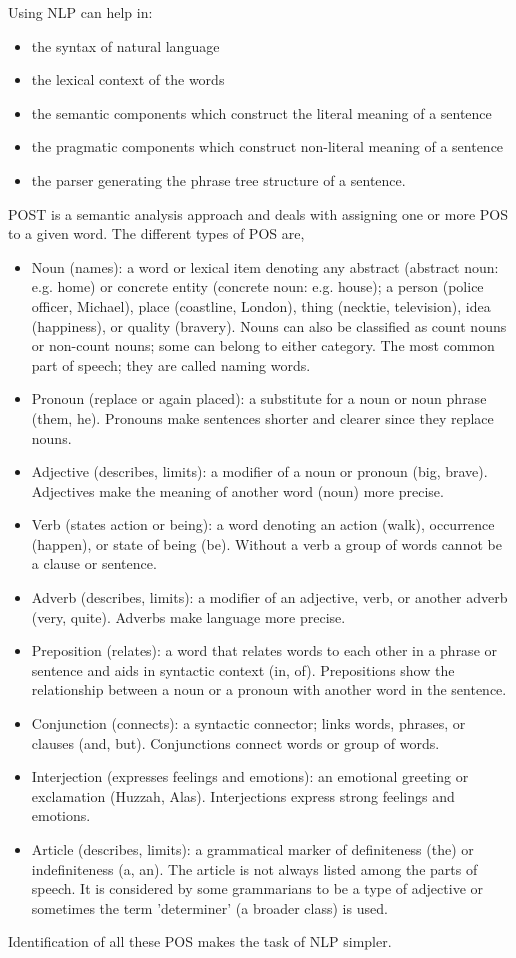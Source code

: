 \begin{multicols*}{2}
	Using \gls{NLP} can help in:
	\begin{itemize}
		\item the syntax of natural language
		\item the lexical context of the words
		\item the semantic components which construct the literal meaning of a sentence
		\item the pragmatic components which construct non-literal meaning of a sentence
		\item the parser generating the phrase tree structure of a sentence.
	\end{itemize}
	\gls{POST} is a semantic analysis approach and deals with assigning one or more \gls{POS} to a given word. The different types of \gls{POS} are,
	\begin{itemize}
		\item Noun (names): a word or lexical item denoting any abstract (abstract noun: e.g. home) or concrete entity (concrete noun: e.g. house); a person (police officer, Michael), place (coastline, London), thing (necktie, television), idea (happiness), or quality (bravery). Nouns can also be classified as count nouns or non-count nouns; some can belong to either category. The most common part of speech; they are called naming words.
		\item Pronoun (replace or again placed): a substitute for a noun or noun phrase (them, he). Pronouns make sentences shorter and clearer since they replace nouns.
		\item Adjective (describes, limits): a modifier of a noun or pronoun (big, brave). Adjectives make the meaning of another word (noun) more precise.
		\item Verb (states action or being): a word denoting an action (walk), occurrence (happen), or state of being (be). Without a verb a group of words cannot be a clause or sentence.
		\item Adverb (describes, limits): a modifier of an adjective, verb, or another adverb (very, quite). Adverbs make language more precise.
		\item Preposition (relates): a word that relates words to each other in a phrase or sentence and aids in syntactic context (in, of). Prepositions show the relationship between a noun or a pronoun with another word in the sentence.
		\item Conjunction (connects): a syntactic connector; links words, phrases, or clauses (and, but). Conjunctions connect words or group of words.
		\item Interjection (expresses feelings and emotions): an emotional greeting or exclamation (Huzzah, Alas). Interjections express strong feelings and emotions.
		\item Article (describes, limits): a grammatical marker of definiteness (the) or indefiniteness (a, an). The article is not always listed among the parts of speech. It is considered by some grammarians to be a type of adjective or sometimes the term 'determiner' (a broader class) is used.
	\end{itemize}
	Identification of all these POS makes the task of NLP simpler.
\end{multicols*}